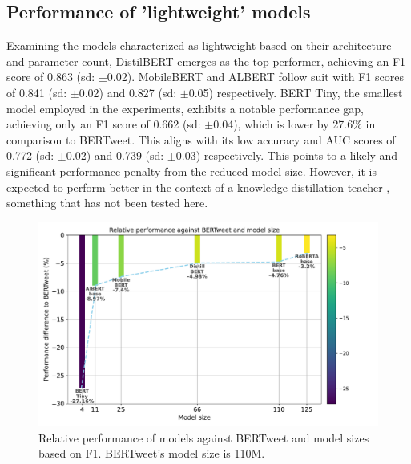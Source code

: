 \subsection{Performance of 'lightweight' models}
Examining the models characterized as lightweight based on their architecture and parameter count, DistilBERT emerges as the top performer, achieving an F1 score of 0.863 (sd: $\pm$0.02). MobileBERT and ALBERT follow suit with F1 scores of 0.841 (sd: $\pm$0.02) and 0.827 (sd: $\pm$0.05) respectively. BERT Tiny, the smallest model employed in the experiments, exhibits a notable performance gap, achieving only an F1 score of 0.662 (sd: $\pm$0.04), which is lower by 27.6\% in comparison to BERTweet. This aligns with its low accuracy and AUC scores of 0.772 (sd: $\pm$0.02) and 0.739 (sd: $\pm$0.03) respectively. This points to a likely and significant performance penalty from the reduced model size. However, it is expected to perform better in the context of a knowledge distillation teacher \cite{turcWellReadStudentsLearn2019}, something that has not been tested here.\\

\begin{figure}[htb]
    \centering
    \captionsetup{font=small}
    \includegraphics[width=12cm]{figures/model_size_vs_perf.pdf}
    \vspace*{-3mm}
    \caption{Relative performance of models against BERTweet and model sizes based on F1. BERTweet's model size is 110M.}
    \label{fig: model_size_vs_perf}
\end{figure}

